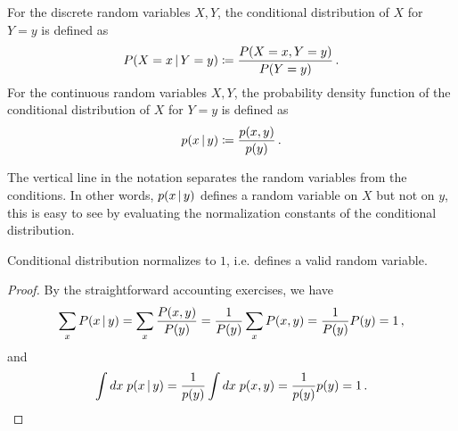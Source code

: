 \begin{mybox}
\begin{definition}\label{def:cond_dist}
    For the discrete random variables $X,Y$, the conditional distribution of $X$ for $Y = y$ is defined as
    \begin{align}
        P(X = x\,|\, Y = y) \coloneqq \frac{P(X = x, Y = y)}{P(Y = y)}\,.
    \end{align}
    For the continuous random variables $X,Y$, the probability density function of the conditional distribution of $X$ for $Y = y$ is defined as
    \begin{align}
        p(x\,|\, y) \coloneqq \frac{p(x,y)}{p(y)}\,.
    \end{align}
\end{definition}
\end{mybox}
The vertical line in the notation separates the random variables from the conditions.
In other words, $p(x\,|\, y)$ defines a random variable on $X$ but not on $y$, this is easy to see by evaluating the normalization constants of the conditional distribution.

\begin{corollary}
    Conditional distribution normalizes to $1$, i.e. defines a valid random variable.
\end{corollary}
\begin{proof}
    By the straightforward accounting exercises, we have
    \begin{align}
        \sum_x P(x\,|\, y) = \sum_x \frac{P(x,y)}{P(y)} = \frac{1}{P(y)}\sum_x P(x,y) = \frac{1}{P(y)}P(y) = 1\,,
    \end{align}
    and
    \begin{align}
        \int dx\; p(x\,|\, y) = \frac{1}{p(y)}\int dx\; p(x,y) = \frac{1}{p(y)}p(y) = 1\,.
    \end{align}
\end{proof}

